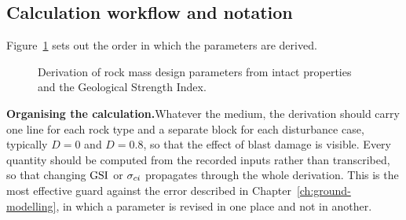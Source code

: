 \subsection{Calculation workflow and notation}
\label{sec:calculation-workflow-and-notation}

Figure~\ref{fig:hb-parameter-workflow} sets out the order in which the
parameters are derived.

\begin{figure}[htbp]
\centering
{}
\caption{Derivation of rock mass design parameters from intact properties and the Geological Strength Index.}
\label{fig:hb-parameter-workflow}
\end{figure}

\noindent\textbf{Organising the calculation.}\enspace Whatever the medium, the
derivation should carry one line for each rock type and a separate block for
each disturbance case, typically \(D=0\) and \(D=0.8\), so that the effect of
blast damage is visible. Every quantity should be computed
from the recorded inputs rather than transcribed, so that changing
\(\mathrm{GSI}\) or \(\sigma_{ci}\) propagates through the whole derivation. This is the
most effective guard against the error described in
Chapter~\ref{ch:ground-modelling}, in which a parameter is revised in one
place and not in another.

